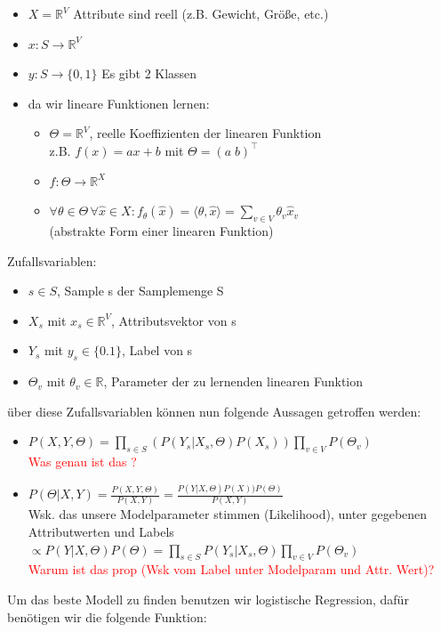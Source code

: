 \documentclass[12pt,a4paper]{article}
\newcommand{\red}[1]{\textcolor{red} {#1}}
\begin{document}
\begin{itemize}
\item $X=\mathbb{R}^V$ Attribute sind reell (z.B. Gewicht, Größe, etc.)
\item $x:S\rightarrow\mathbb{R}^V$
\item $y:S\rightarrow \{0,1\}$ Es gibt 2 Klassen
\item da wir lineare Funktionen lernen:
\begin{itemize}
\item $\Theta = \mathbb{R}^V$, reelle Koeffizienten der linearen Funktion\\
z.B. $f(x) = ax+b$ mit $\Theta = (a\; b)^\top$
\item $f: \Theta\rightarrow\mathbb{R}^X$
\item $\displaystyle \forall \theta\in\Theta \, \forall \hat{x}\in X: f_\theta(\hat{x}) = \langle \theta, \hat{x} \rangle = \sum_{v\in V} \theta_v \hat{x}_v$\\
(abstrakte Form einer linearen Funktion)
\end{itemize}
\end{itemize}
Zufallsvariablen:
\begin{itemize}
\item $s\in S$, Sample s der Samplemenge S
\item $X_s$ mit $x_s \in \mathbb{R}^V$, Attributsvektor von s
\item $Y_s$ mit $y_s \in  \{0.1\}$, Label von s
\item $\Theta_v$ mit $\theta_v \in \mathbb{R}$, Parameter der zu lernenden linearen Funktion
\end{itemize}
über diese Zufallsvariablen können nun folgende Aussagen getroffen werden:
\begin{itemize}
\item $\displaystyle P(X,Y,\Theta) = \prod_{s\in S} (P(Y_s|X_s, \Theta)P(X_s)) \prod_{v\in V} P(\Theta_v)$\\
\red{Was genau ist das ?}
\item $\displaystyle P(\Theta | X,Y) = \frac{P(X,Y,\Theta)}{P(X,Y)} = \frac{P(Y|X, \Theta)P(X))P(\Theta)}{P(X,Y)}$\\Wsk. das unsere Modelparameter stimmen (Likelihood), unter gegebenen Attributwerten und Labels\\
$\displaystyle \propto P(Y|X,\Theta)P(\Theta) = \prod_{s\in S} P(Y_s|X_s,\Theta)\prod_{v\in V} P(\Theta_v)$\\
\red{Warum ist das prop (Wsk vom Label unter Modelparam und Attr. Wert)?}
\end{itemize}
Um das beste Modell zu finden benutzen wir logistische Regression, dafür benötigen wir die folgende Funktion:
\end{document}
